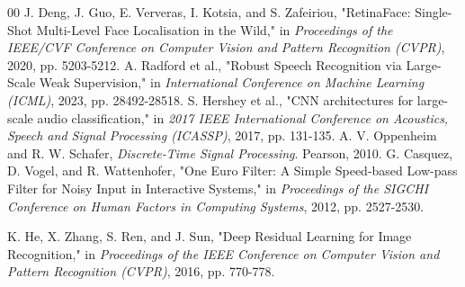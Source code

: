 \documentclass[conference]{IEEEtran}
\begin{document}
\begin{thebibliography}{00}
 J. Deng, J. Guo, E. Ververas, I. Kotsia, and S. Zafeiriou, "RetinaFace: Single-Shot Multi-Level Face Localisation in the Wild," in \textit{Proceedings of the IEEE/CVF Conference on Computer Vision and Pattern Recognition (CVPR)}, 2020, pp. 5203-5212.
 A. Radford et al., "Robust Speech Recognition via Large-Scale Weak Supervision," in \textit{International Conference on Machine Learning (ICML)}, 2023, pp. 28492-28518.
 S. Hershey et al., "CNN architectures for large-scale audio classification," in \textit{2017 IEEE International Conference on Acoustics, Speech and Signal Processing (ICASSP)}, 2017, pp. 131-135.
 A. V. Oppenheim and R. W. Schafer, \textit{Discrete-Time Signal Processing}. Pearson, 2010.
 G. Casquez, D. Vogel, and R. Wattenhofer, "One Euro Filter: A Simple Speed-based Low-pass Filter for Noisy Input in Interactive Systems," in \textit{Proceedings of the SIGCHI Conference on Human Factors in Computing Systems}, 2012, pp. 2527-2530.

 K. He, X. Zhang, S. Ren, and J. Sun, "Deep Residual Learning for Image Recognition," in \textit{Proceedings of the IEEE Conference on Computer Vision and Pattern Recognition (CVPR)}, 2016, pp. 770-778.

\end{thebibliography}
\end{document}
